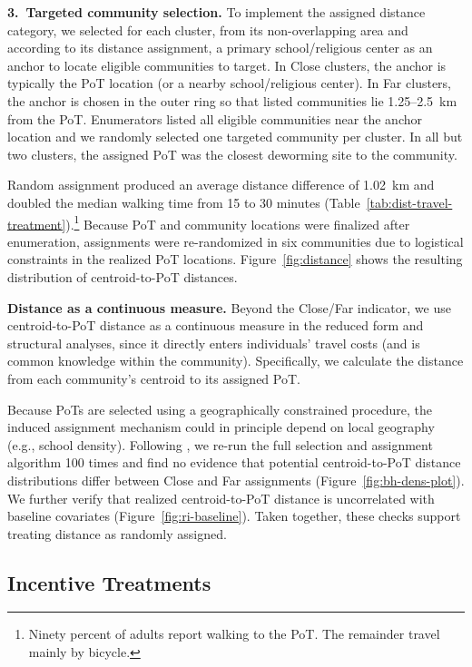 \vspace{0.4em}
\noindent\textbf{3.\ Targeted community selection.}
To implement the assigned distance category, we selected for each cluster, from its non-overlapping area and according to its distance assignment, a primary school/religious center as an anchor to locate eligible communities to target. In Close clusters, the anchor is typically the PoT location (or a nearby school/religious center). In Far clusters, the anchor is chosen in the outer ring so that listed communities lie 1.25--2.5~km from the PoT. Enumerators listed all eligible communities near the anchor location and we randomly selected one targeted community per cluster. In all but two clusters, the assigned PoT was the closest deworming site to the community. 

Random assignment produced an average distance difference of 1.02~km and doubled the median walking time from 15 to 30 minutes (Table~\ref{tab:dist-travel-treatment}).\footnote{Ninety percent of adults report walking to the PoT. The remainder travel mainly by bicycle.} Because PoT and community locations were finalized after enumeration, assignments were re-randomized in six communities due to logistical constraints in the realized PoT locations.
Figure~\ref{fig:distance} shows the resulting distribution of centroid-to-PoT distances. 

\vspace{0.5em}
\textbf{Distance as a continuous measure.}
Beyond the Close/Far indicator, we use centroid-to-PoT distance as a continuous measure in the reduced form and structural
analyses, since it directly enters individuals' travel costs (and is common knowledge within the community). Specifically,
we calculate the distance from each community's centroid to its assigned PoT.

Because PoTs are selected using a geographically constrained procedure, the induced assignment mechanism could in principle
depend on local geography (e.g., school density). Following \citet{borusyak2023nonrandom}, we re-run the full selection and
assignment algorithm 100 times and find no evidence that potential centroid-to-PoT distance distributions differ between Close
and Far assignments (Figure~\ref{fig:bh-dens-plot}). We further verify that realized centroid-to-PoT distance is uncorrelated
with baseline covariates (Figure~\ref{fig:ri-baseline}). Taken together, these checks support treating distance as randomly assigned.

\subsection{Incentive Treatments}

